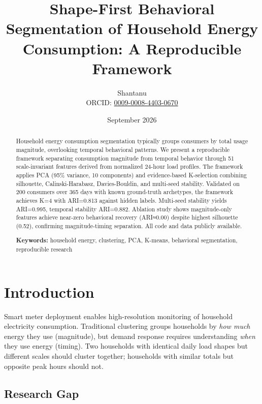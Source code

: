\documentclass[11pt,a4paper]{article}
\title{\textbf{Shape-First Behavioral Segmentation of Household Energy Consumption: A Reproducible Framework}}
\author{
  Shantanu\\
  ORCID: \href{https://orcid.org/0009-0008-4403-0670}{0009-0008-4403-0670}\\
  [Institution/Department - To be added]
}
\date{September 2026}
\begin{document}
\maketitle

\begin{abstract}
Household energy consumption segmentation typically groups consumers by total usage magnitude, overlooking temporal behavioral patterns. We present a reproducible framework separating consumption magnitude from temporal behavior through 51 scale-invariant features derived from normalized 24-hour load profiles. The framework applies PCA (95\% variance, 10 components) and evidence-based K-selection combining silhouette, Calinski-Harabasz, Davies-Bouldin, and multi-seed stability. Validated on 200 consumers over 365 days with known ground-truth archetypes, the framework achieves K=4 with ARI=0.813 against hidden labels. Multi-seed stability yields ARI=0.995, temporal stability ARI=0.882. Ablation study shows magnitude-only features achieve near-zero behavioral recovery (ARI≈0.00) despite highest silhouette (0.52), confirming magnitude-timing separation. All code and data publicly available.

\textbf{Keywords:} household energy, clustering, PCA, K-means, behavioral segmentation, reproducible research
\end{abstract}

\section{Introduction}

Smart meter deployment enables high-resolution monitoring of household electricity consumption. Traditional clustering groups households by \emph{how much} energy they use (magnitude), but demand response requires understanding \emph{when} they use energy (timing). Two households with identical daily load shapes but different scales should cluster together; households with similar totals but opposite peak hours should not.

\subsection{Research Gap}
\end{document}
